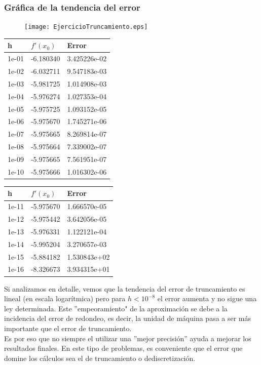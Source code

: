 \begin{frame}
\frametitle{Gráfica de la tendencia del error}
\begin{figure}
	\centering
	\texttt{[image: EjercicioTruncamiento.eps]} 
\end{figure}
\end{frame}
\begin{frame}
\begin{center}
\begin{tabular}{l | l | l}
h & $f'(x_{0})$ & Error \\ \hline
1e-01 & -6.180340 & 3.425226e-02 \\ \hline
1e-02 & -6.032711 & 9.547183e-03 \\ \hline
1e-03 & -5.981725 & 1.014908e-03 \\ \hline
1e-04 & -5.976274 & 1.027353e-04 \\ \hline
1e-05 & -5.975725 & 1.093152e-05 \\ \hline
1e-06 & -5.975670 & 1.745271e-06 \\ \hline
1e-07 & -5.975665 & 8.269814e-07 \\ \hline
1e-08 & -5.975664 & 7.339002e-07 \\ \hline
1e-09 & -5.975665 & 7.561951e-07 \\ \hline
1e-10 & -5.975666 & 1.016302e-06 \\ \hline
\end{tabular}
\end{center}
\end{frame}
\begin{frame}
\begin{center}
\begin{tabular}{l | l | l}
h & $f'(x_{0})$ & Error \\ \hline
1e-11 & -5.975670 & 1.666570e-05 \\ \hline
1e-12 & -5.975442 & 3.642056e-05 \\ \hline
1e-13 & -5.976331 & 1.122121e-04 \\ \hline
1e-14 & -5.995204 & 3.270657e-03 \\ \hline
1e-15 & -5.884182 & 1.530843e+02 \\ \hline
1e-16 & -8.326673 & 3.934315e+01 \\ \hline
\end{tabular}
\end{center}
\end{frame}
\begin{frame}
Si analizamos en detalle, vemos que la tendencia del error de truncamiento es lineal (en escala logarítmica) pero para $h < 10^{-8}$ el error aumenta y no sigue una ley determinada. Este ''empeoramiento" de la aproximación se debe a la incidencia del error de redondeo, es decir, la unidad de máquina pasa a ser más importante que el error de truncamiento.
\\
\medskip
Es por eso que no siempre el utilizar una ''mejor precisión'' ayuda a mejorar los resultados finales. En este tipo de problemas, es conveniente que el error que domine los cálculos sea el de truncamiento o dediscretización.
\end{frame}
